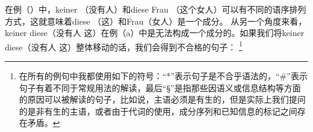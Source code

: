 在例（）中，keiner （没有人）和diese Frau （这个女人）可以有不同的语序排列方式，这就意味着diese （这）和Frau（女人）是一个成分。
\eal
{}
\zl
从另一个角度来看，keiner diese（没有人 这）在例（a）中是无法构成一个成分的。如果我们将keiner diese（没有人 这）整体移动的话，我们会得到不合格的句子：
\footnote{%
在所有的例句中我都使用如下的符号：“*”\isce{*}{*}表示句子是不合乎语法的，“\#”\isce{\#}{\#}表示句子有着不同于常规用法的解读，最后“\S”\isce{\S}{\S}是指那些因语义或信息结构等方面的原因可以被解读的句子，比如说，主语必须是有生的，但是实际上我们提问的是非有生的主语，或者由于代词的使用，成分序列和已知信息的标记之间存在矛盾。 }
 \eal
{}
\zl

